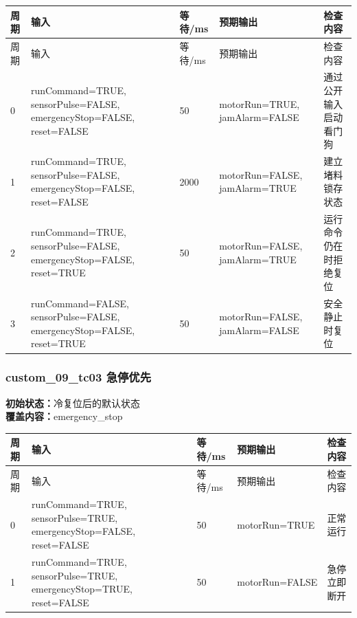 \begin{longtable}{L{1.0cm}L{4.7cm}L{1.4cm}L{4.0cm}L{2.1cm}}

\toprule

周期 & 输入 & 等待/ms & 预期输出 & 检查内容\\

\midrule

\endfirsthead

\toprule

周期 & 输入 & 等待/ms & 预期输出 & 检查内容\\

\midrule

\endhead

0 & runCommand=TRUE, sensorPulse=FALSE, emergencyStop=FALSE, reset=FALSE & 50 & motorRun=TRUE, jamAlarm=FALSE & 通过公开输入启动看门狗\\

1 & runCommand=TRUE, sensorPulse=FALSE, emergencyStop=FALSE, reset=FALSE & 2000 & motorRun=FALSE, jamAlarm=TRUE & 建立堵料锁存状态\\

2 & runCommand=TRUE, sensorPulse=FALSE, emergencyStop=FALSE, reset=TRUE & 50 & motorRun=FALSE, jamAlarm=TRUE & 运行命令仍在时拒绝复位\\

3 & runCommand=FALSE, sensorPulse=FALSE, emergencyStop=FALSE, reset=TRUE & 50 & motorRun=FALSE, jamAlarm=FALSE & 安全静止时复位\\

\bottomrule

\end{longtable}

\subsubsection{{\ttfamily custom\_09\_tc03} 急停优先}

\noindent\textbf{初始状态：}冷复位后的默认状态\\

\textbf{覆盖内容：}emergency\_stop

\begin{longtable}{L{1.0cm}L{4.7cm}L{1.4cm}L{4.0cm}L{2.1cm}}

\toprule

周期 & 输入 & 等待/ms & 预期输出 & 检查内容\\

\midrule

\endfirsthead

\toprule

周期 & 输入 & 等待/ms & 预期输出 & 检查内容\\

\midrule

\endhead

0 & runCommand=TRUE, sensorPulse=TRUE, emergencyStop=FALSE, reset=FALSE & 50 & motorRun=TRUE & 正常运行\\

1 & runCommand=TRUE, sensorPulse=TRUE, emergencyStop=TRUE, reset=FALSE & 50 & motorRun=FALSE & 急停立即断开\\

\bottomrule

\end{longtable}

